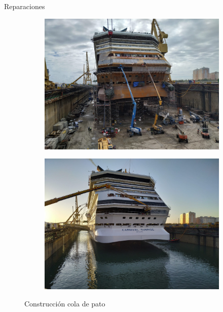 \documentclass{beamer}
\begin{document}
\begin{frame}{Reparaciones}

\begin{figure}
\centering
\begin{subfigure}[h]{0.45\textwidth} 
	\includegraphics[width=\textwidth]{pato1}
	
\end{subfigure}       
\begin{subfigure}[h]{0.45\textwidth} 
	\includegraphics[width=\textwidth]{pato2}
	
\end{subfigure}

\caption{Construcción cola de pato}
\end{figure}

\end{frame}
\end{document}
